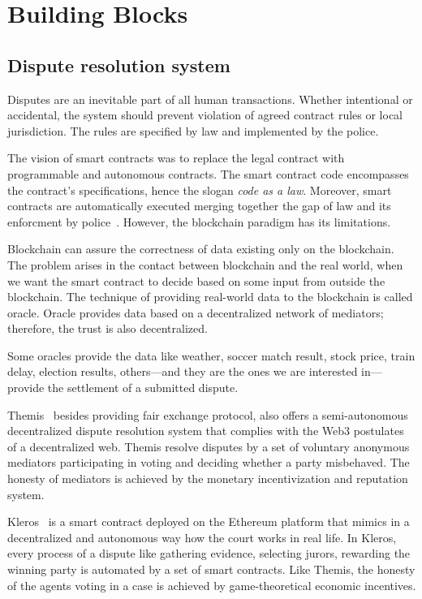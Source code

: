 \documentclass{ieeeaccess}
\begin{document}
\section{Building Blocks}\label{sec:building-blocks}
\subsection{Dispute resolution system}

Disputes are an inevitable part of all human transactions. Whether intentional or accidental, the system should prevent violation of agreed contract rules or local jurisdiction. The rules are specified by law and implemented by the police.

The vision of smart contracts was to replace the legal contract with
programmable and autonomous contracts. The smart contract code encompasses the contract's specifications, hence the slogan \textit{code as a law}. Moreover, smart contracts are automatically executed merging together the gap of law and its enforcment by police~\cite{allenGovernanceBlockchainDispute2019}. However, the blockchain paradigm has its limitations. 
 
Blockchain can assure the correctness of data existing only on the blockchain. The problem arises in the contact between blockchain and the real world, when we want the smart contract to decide based on some input from outside the blockchain. The technique of providing real-world data to the blockchain is called oracle. Oracle provides data based on a decentralized network of mediators; therefore, the trust is also decentralized.

Some oracles provide the data like weather, soccer match result, stock
price, train delay, election results, others—and they are the ones we
are interested in—provide the settlement of a submitted dispute.

Themis~\cite{mengThemisDecentralizedEscrow2019} besides providing fair exchange protocol,
also offers a semi-autonomous decentralized dispute resolution system that complies with the Web3 postulates of a decentralized web. Themis
resolve disputes by a set of voluntary anonymous mediators participating
in voting and deciding whether a party misbehaved. The honesty of
mediators is achieved by the monetary incentivization and reputation
system.

Kleros~\cite{bergollaKlerosSociolegalCase2022} is a smart contract deployed on the Ethereum platform that mimics in a decentralized and autonomous way how the court works in real life. In Kleros, every process of a dispute like gathering evidence, selecting jurors, rewarding the winning party is automated by a set of smart contracts. Like Themis, the honesty of the agents voting in a case is achieved by game-theoretical economic incentives.
\end{document}

